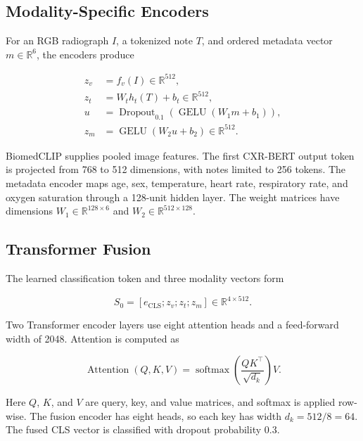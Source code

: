 \documentclass[runningheads,a4paper]{llncs}
\begin{document}
\subsection{Modality-Specific Encoders}

For an RGB radiograph $I$, a tokenized note $T$, and ordered metadata vector $m\in\mathbb{R}^{6}$, the encoders produce

\begin{align}
z_v &= f_v(I)\in\mathbb{R}^{512},
\label{eq:vision}\\
z_t &= W_t h_t(T)+b_t\in\mathbb{R}^{512},
\label{eq:text}\\
u &= \operatorname{Dropout}_{0.1}
(\operatorname{GELU}(W_1m+b_1)),
\label{eq:meta1}\\
z_m &= \operatorname{GELU}(W_2u+b_2)
\in\mathbb{R}^{512}.
\label{eq:meta2}
\end{align}

BiomedCLIP supplies pooled image features. The first CXR-BERT output token is projected from 768 to 512 dimensions, with notes limited to 256 tokens. The metadata encoder maps age, sex, temperature, heart rate, respiratory rate, and oxygen saturation through a 128-unit hidden layer. The weight matrices have dimensions $W_1\in\mathbb{R}^{128\times6}$ and $W_2\in\mathbb{R}^{512\times128}$.

\subsection{Transformer Fusion}

The learned classification token and three modality vectors form

\begin{equation}
S_0=[e_{\mathrm{CLS}};z_v;z_t;z_m]
\in\mathbb{R}^{4\times512}.
\end{equation}

Two Transformer encoder layers use eight attention heads and a feed-forward width of 2048. Attention is computed as

\begin{equation}
\operatorname{Attention}(Q,K,V)
=\operatorname{softmax}\!\left(\frac{QK^{\top}}{\sqrt{d_k}}\right)V.
\end{equation}

Here $Q$, $K$, and $V$ are query, key, and value matrices, and softmax is applied row-wise. The fusion encoder has eight heads, so each key has width $d_k=512/8=64$. The fused CLS vector is classified with dropout probability 0.3.
\end{document}
